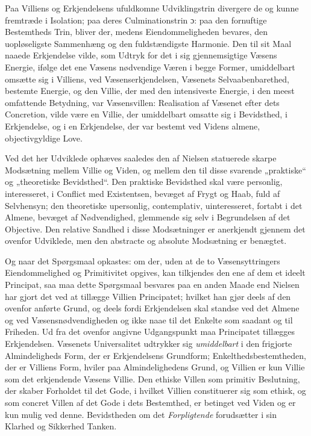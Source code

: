 \documentclass[12pt,a4paper]{book}
\newcommand{\opage}[1]{\marginnote{\footnotesize\textit{[#1]}}}
\begin{document}
Paa Villiens og Erkjendelsens ufuldkomne Udviklingstrin divergere de og
kunne fremtræde i Isolation; paa deres \opage{137}Culminationstrin ɔ: paa den
fornuftige Bestemtheds Trin, bliver der, medens Eiendommeligheden
bevares, den uopløseligste Sammenhæng og den fuldstændigste Harmonie.
Den til sit Maal naaede Erkjendelse vilde, som Udtryk for det i sig
gjennemsigtige Væsens Energie, ifølge det ene Væsens nødvendige Væren
i begge Former, umiddelbart omsætte sig i Villiens, ved
Væsenserkjendelsen, Væsenets Selvaabenbarethed, bestemte Energie, og
den Villie, der med den intensiveste Energie, i den meest omfattende
Betydning, var Væsensvillen: Realisation af Væsenet efter dets
Concretion, vilde være en Villie, der umiddelbart omsatte sig i
Bevidsthed, i Erkjendelse, og i en Erkjendelse, der var bestemt ved
Videns almene, objectivgyldige Love.

Ved det her Udviklede ophæves saaledes den af Nielsen statuerede skarpe
Modsætning mellem Villie og Viden, og mellem den til disse svarende
„praktiske“ og „theoretiske Bevidsthed“. Den praktiske Bevidsthed
skal være personlig, interesseret, i Conflict med Existentsen, bevæget
af Frygt og Haab, fuld af Selvhensyn; den theoretiske upersonlig,
contemplativ, uinteresseret, fortabt i det Almene, bevæget af
Nødvendighed, glemmende sig selv i Begrundelsen af det Objective. Den
relative Sandhed i disse Modsætninger er anerkjendt gjennem det ovenfor
Udviklede, men den abstracte og absolute Modsætning er benægtet.

Og naar det Spørgsmaal opkastes: om der, uden at de to
Væsensyttringers Eiendommelighed og Primitivitet opgives, kan
tilkjendes den ene af dem et ideelt Principat, saa maa dette
Spørgsmaal besvares paa en anden Maade end Nielsen har gjort det ved
at tillægge Villien Principatet; hvilket han gjør deels af den ovenfor
anførte Grund, og deels fordi Erkjendelsen skal standse ved det Almene
og ved Væsensnødvendigheden og ikke naae til det Enkelte som saadant og
til Friheden. Ud fra det ovenfor angivne Udgangspunkt maa Principatet
tillægges Erkjendelsen. Væsenets Universalitet udtrykker sig
\emph{umiddelbart} i den frigjorte Almindeligheds Form, der er Erkjendelsens
Grundform; Enkelthedsbestemtheden, der er Villiens Form, hviler paa
\opage{138}Almindelighedens Grund, og Villien er kun Villie som det erkjendende
Væsens Villie. Den ethiske Villen som primitiv Beslutning, der skaber
Forholdet til det Gode, i hvilket Villien constituerer sig som ethisk,
og som concret Villen af det Gode i dets Bestemthed, er betinget ved
Viden og er kun mulig ved denne. Bevidstheden om det \emph{Forpligtende} forudsætter i sin Klarhed og Sikkerhed Tanken.
\end{document}
